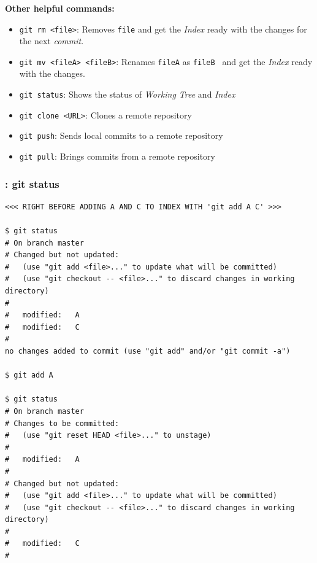 \begin{frame}
  \frametitle{\insertsubsection}

  \textbf{Other helpful commands:}
  \begin{itemize}
  \item \texttt{git rm <file>}: Removes \texttt{file} and get the
    \textit{Index} ready with the changes for the next
    \textit{commit}. \vspacing
  \item \texttt{git mv <fileA> <fileB>}: Renames \texttt{fileA} as
    \texttt{fileB } and get the \textit{Index} ready with the changes.  \vspacing
  \item \texttt{git status}: Shows the status of \textit{Working
      Tree} and \textit{Index} \vspacing
  \item \texttt{git clone <URL>}: Clones a remote repository
    \vspacing
  \item \texttt{git push}: Sends local commits to a remote repository\vspacing
  \item \texttt{git pull}: Brings commits from a remote repository\vspacing
  \end{itemize}
\end{frame}


\begin{frame}[fragile]
  \frametitle{\insertsubsection: git status}

  \begin{tiny}
\begin{verbatim}
<<< RIGHT BEFORE ADDING A AND C TO INDEX WITH 'git add A C' >>>

$ git status
# On branch master
# Changed but not updated:
#   (use "git add <file>..." to update what will be committed)
#   (use "git checkout -- <file>..." to discard changes in working directory)
#
#	modified:   A
#	modified:   C
#
no changes added to commit (use "git add" and/or "git commit -a")

$ git add A

$ git status
# On branch master
# Changes to be committed:
#   (use "git reset HEAD <file>..." to unstage)
#
#	modified:   A
#
# Changed but not updated:
#   (use "git add <file>..." to update what will be committed)
#   (use "git checkout -- <file>..." to discard changes in working directory)
#
#	modified:   C
#

\end{verbatim}
  \end{tiny}

\end{frame}

